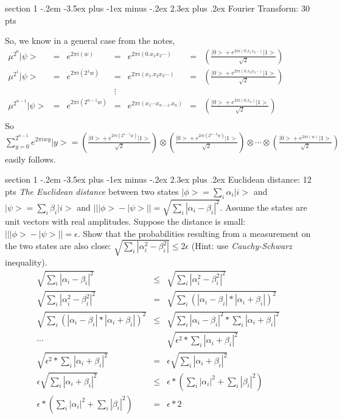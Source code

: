 \documentclass[12pt]{article}
\makeatletter
\newcommand{\<}{\langle}
\renewcommand{\>}{\rangle}
\newenvironment{problem}{\@startsection
       {section}
       {1}
       {-.2em}
       {-3.5ex plus -1ex minus -.2ex}
       {2.3ex plus .2ex}
       {\pagebreak[3]
       \large\bf\noindent{Problem }
       }
       }
       {%
       \begin{center}\large\bf \end{center}}
\def\ket#1{\big|{#1}\big>}
\makeatother
\begin{document}
\begin{problem}{Fourier Transform: 30 pts}
\begin{enumerate}
So, we know in a general case from the notes,\\
$\begin{array}{ccccccc}
\mu^{2^0}\ket{\psi} &=& e^{2\pi i(w)} &=& e^{2\pi i(0.x_1x_2\cdots)} &=& \left( \frac{\ket{0} + e^{2\pi i(0.x_1x_2\cdots)}\ket{1}}{\sqrt{2}} \right)\\
\mu^{2^1}\ket{\psi} &=& e^{2\pi i(2^1w)} &=& e^{2\pi i(x_1.x_2x_3\cdots)} &=& \left( \frac{\ket{0} + e^{2\pi i(0.x_2x_3\cdots)}\ket{1}}{\sqrt{2}} \right)\\
&&&\vdots&&&\\
\mu^{2^{n-1}}\ket{\psi} &=& e^{2\pi i(2^{n-1}w)} &=& e^{2\pi i(x_1\cdots x_{n-1}.x_n)} &=& \left( \frac{\ket{0} + e^{2\pi i(0.x_n)}\ket{1}}{\sqrt{2}} \right)\\
\end{array}$\\
So $\sum\limits_{y=0}^{2^{n-1}}e^{2\pi i wy}\ket{y} = \left( \frac{\ket{0} + e^{2\pi i(2^{n-1}w)}\ket{1}}{\sqrt{2}} \right) \otimes \left( \frac{\ket{0} + e^{2\pi i(2^{n-2}w)}\ket{1}}{\sqrt{2}} \right) \otimes \cdots \otimes \left( \frac{\ket{0} + e^{2\pi i(w)}\ket{1}}{\sqrt{2}} \right)$ easily follows.
\end{enumerate}
\end{problem}

\begin{problem}{Euclidean distance: 12 pts}
\emph{The Euclidean distance} between two states $\ket{\phi} = \sum_i\alpha_i\ket{i}$ and $\ket{\psi} = \sum_i\beta_i\ket{i}$ and $\left|\left|\ket{\phi}-\ket{\psi}\right|\right| = \sqrt{\sum_i\left| \alpha_i - \beta_i\right|^2}$. Assume the states are unit vectors with real amplitudes. Suppose the distance is small: $\left|\left|\ket{\phi}-\ket{\psi}\right|\right| = \epsilon$. Show that the probabilities resulting from a measurement on the two states are also close: $\sqrt{\sum_i\left| \alpha_i^2 - \beta_i^2\right|} \leq 2\epsilon$ (Hint: use \emph{Cauchy-Schwarz} inequality).\\
$$\begin{array}{ccc}
\sqrt{\sum_i|\alpha_i - \beta_i|^2} &\leq & \sqrt{\sum_i|\alpha_i^2 - \beta_i^2|^2}\\
\sqrt{\sum_i|\alpha_i^2 - \beta_i^2|^2} &=& \sqrt{\sum_i\left(|\alpha_i - \beta_i|*|\alpha_i + \beta_i|\right)^2}\\
\sqrt{\sum_i\left(|\alpha_i - \beta_i|*|\alpha_i + \beta_i|\right)^2} & \leq & \sqrt{\sum_i|\alpha_i - \beta_i|^2*\sum_i|\alpha_i + \beta_i|^2}\\
\cdots & & \sqrt{\epsilon^2*\sum_i|\alpha_i + \beta_i|^2}\\
\sqrt{\epsilon^2*\sum_i|\alpha_i + \beta_i|^2} &=& \epsilon\sqrt{\sum_i|\alpha_i + \beta_i|^2}\\
\epsilon\sqrt{\sum_i|\alpha_i + \beta_i|^2} &\leq & \epsilon*\left(\sum_i|\alpha_i|^2 + \sum_i|\beta_i|^2\right)\\
\epsilon*\left(\sum_i|\alpha_i|^2 + \sum_i|\beta_i|^2\right)  &=& \epsilon*2
\end{array} $$
\end{problem}
\end{document}
